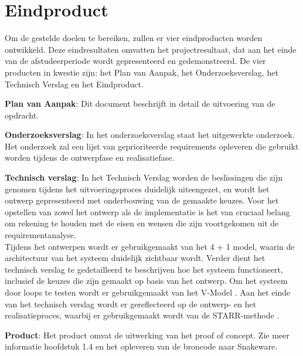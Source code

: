 \section{Eindproduct}
Om de gestelde doelen te bereiken, zullen er vier eindproducten worden ontwikkeld.
Deze eindresultaten omvatten het projectresultaat, dat aan het einde van de afstudeerperiode wordt gepresenteerd en gedemonstreerd.
De vier producten in kwestie zijn: het Plan van Aanpak, het Onderzoeksverslag, het Technisch Verslag en het Eindproduct.

\whitespace[2]
\textbf{Plan van Aanpak}: Dit document beschrijft in detail de uitvoering van de opdracht.

\whitespace[2]
\textbf{Onderzoeksverslag}: In het onderzoeksverslag staat het uitgewerkte onderzoek.
Het onderzoek zal een lijst van geprioriteerde requirements opleveren die gebruikt worden tijdens de ontwerpfase en realisatiefase.

\whitespace[2]
\textbf{Technisch verslag}: In het Technisch Verslag worden de beslissingen die zijn genomen tijdens het uitvoeringsproces duidelijk uiteengezet, en wordt het ontwerp gepresenteerd met onderbouwing van de gemaakte keuzes.
Voor het opstellen van zowel het ontwerp als de implementatie is het van cruciaal belang om rekening te houden met de eisen en wensen die zijn voortgekomen uit de requirementanalyse. \\
Tijdens het ontwerpen wordt er gebruikgemaakt van het 4 + 1 model, waarin de architectuur van het systeem duidelijk zichtbaar wordt.
Verder dient het technisch verslag te gedetailleerd te beschrijven hoe het systeem functioneert, inclusief de keuzes die zijn gemaakt op basis van het ontwerp.
Om het systeem door loops te testen wordt er gebruikgemaakt van het V-Model \Parencite{VModel}.
Aan het einde van het technisch verslag wordt er gereflecteerd op de ontwerp- en het realisatieproces, waarbij er gebruikgemaakt wordt van de STARR-methode \Parencite{STARR}.

\whitespace[2]
\textbf{Product}: Het product omvat de uitwerking van het proof of concept. Zie meer informatie hoofdstuk 1.4 en het opleveren van de broncode naar Snakeware.
